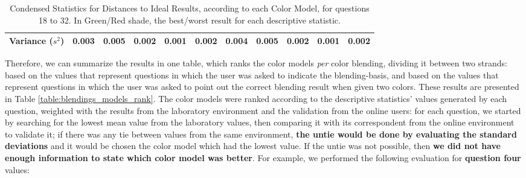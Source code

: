 \begin{itemize}
\begin{table}[htbp]
{\begin{tabular}{@{}ccccccccccc@{}}
      \multicolumn{1}{c|}{Variance ($s^2$)}                                         & \cellcolor[HTML]{FFFFFF}0.003         & \cellcolor[HTML]{FD6864}\textbf{0.005} & \cellcolor[HTML]{FFFFFF}0.002         & \cellcolor[HTML]{32CB00}\textbf{0.001} & \multicolumn{1}{c|}{\cellcolor[HTML]{FFFFFF}0.002}         & \cellcolor[HTML]{FFFFFF}0.004         & \cellcolor[HTML]{FD6864}\textbf{0.005} & \cellcolor[HTML]{FFFFFF}0.002         & \cellcolor[HTML]{32CB00}\textbf{0.001} & \multicolumn{1}{c|}{\cellcolor[HTML]{FFFFFF}0.002} \\ \bottomrule
    \end{tabular}}
    \caption[Condensed Statistics for Distances to Ideal Results, \emph{per} Color Model, questions 18 to 32.]{Condensed Statistics for Distances to Ideal Results, according to each Color Model, for questions 18 to 32. In Green/Red shade, the best/worst result for each descriptive statistic.}
    \vspace{-5pt}
    \label{table:colormodels_expectations_labonline_statistics}
  \end{table}
\end{itemize} \par
%
Therefore, we can summarize the results in one table, which ranks the color models \emph{per} color blending, dividing it between two strands: based on the values that represent questions in which the user was
asked to indicate the blending-basis, and based on the values that represent questions in which the user was asked to point out the correct blending result when given two colors. These results are presented in
Table \ref{table:blendings_models_rank}. The color models were ranked according to the descriptive statistics' values generated by each question, weighted with the results from the laboratory environment and the
validation from the online users: for each question, we started by searching for the lowest mean value from the laboratory values, then comparing it with its correspondent from the online environment to validate
it; if there was any tie between values from the same environment, \textbf{the untie would be done by evaluating the standard deviations} and it would be chosen the color model which had the lowest value. If the
untie was not possible, then \textbf{we did not have enough information to state which color model was better}. For example, we performed the following evaluation for \textbf{question four} values:
%
